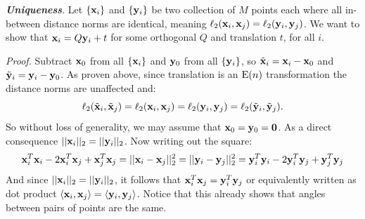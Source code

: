 \textbf{\textit{Uniqueness}}. Let $\{\mathbf{x}_i\}$ and $\{\mathbf{y}_i\}$ be two collection of $M$ points each where all in-between distance norms are identical, meaning $\ell_2(\mathbf{x}_i, \mathbf{x}_j) = \ell_2(\mathbf{y}_i, \mathbf{y}_j)$. We want to show that $\mathbf{x}_i = Q \mathbf{y}_i + t$ for some orthogonal $Q$ and translation $t$, for all $i$.

\textit{Proof.} Subtract $\mathbf{x}_0$ from all $\{\mathbf{x}_i\}$ and $\mathbf{y}_0$ from all $\{\mathbf{y}_i\}$, so $\tilde{\mathbf{x}}_i = \mathbf{x}_i - \mathbf{x}_0$ and $\tilde{\mathbf{y}}_i = \mathbf{y}_i - \mathbf{y}_0$. As proven above, since translation is an $\mathrm{E}(n)$ transformation the distance norms are unaffected and:
\small
\begin{equation*}
    \ell_2(\tilde{\mathbf{x}}_i, \tilde{\mathbf{x}}_j) = \ell_2(\mathbf{x}_i, \mathbf{x}_j) = \ell_2(\mathbf{y}_i, \mathbf{y}_j) = \ell_2(\tilde{\mathbf{y}}_i, \tilde{\mathbf{y}}_j).
\end{equation*}\normalsize
So without loss of generality, we may assume that $\mathbf{x}_0 = \mathbf{y}_0 = \mathbf{0}$. As a direct consequence $||\mathbf{x}_i||_2 = ||\mathbf{y}_i||_2$. Now writing out the square:
\small
\begin{equation*}
    \mathbf{x}_i^T\mathbf{x}_i - 2 \mathbf{x}_i^T\mathbf{x}_j + \mathbf{x}_j^T\mathbf{x}_j = ||\mathbf{x}_i - \mathbf{x}_j||_2^2 = ||\mathbf{y}_i - \mathbf{y}_j||_2^2 = \mathbf{y}_i^T\mathbf{y}_i - 2 \mathbf{y}_i^T\mathbf{y}_j + \mathbf{y}_j^T\mathbf{y}_j
\end{equation*} \normalsize
And since $||\mathbf{x}_i||_2 = ||\mathbf{y}_i||_2$, it follows that $\mathbf{x}_i^T\mathbf{x}_j = \mathbf{y}_i^T\mathbf{y}_j$ or equivalently written as dot product $\langle \mathbf{x}_i, \mathbf{x}_j\rangle = \langle \mathbf{y}_i, \mathbf{y}_j \rangle$. Notice that this already shows that angles between pairs of points are the same.

